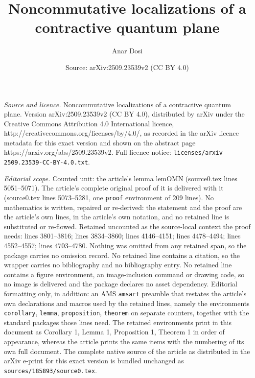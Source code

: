 \documentclass[10pt,a4paper]{amsart}
\title{Noncommutative localizations of a contractive quantum plane}
\author{Anar Dosi}
\date{Source: arXiv:2509.23539v2 (CC BY 4.0)}
\begin{document}
\maketitle

\noindent\emph{Source and licence.} Noncommutative localizations of a contractive quantum plane. Version arXiv:2509.23539v2 (CC BY 4.0), distributed by arXiv under the Creative Commons Attribution 4.0 International licence, http://creativecommons.org/licenses/by/4.0/, as recorded in the arXiv licence metadata for this exact version and shown on the abstract page https://arxiv.org/abs/2509.23539v2. Full licence notice: \texttt{licenses/arxiv-2509.23539-CC-BY-4.0.txt}.\par\smallskip

\noindent\textit{Editorial scope.} Counted unit: the article's lemma lemOMN (source0.tex lines 5051--5071). The article's complete original proof of it is delivered with it (source0.tex lines 5073--5281, one \texttt{proof} environment of 209 lines). No mathematics is written, repaired or re-derived: the statement and the proof are the article's own lines, in the article's own notation, and no retained line is substituted or re-flowed.  Retained uncounted as the source-local context the proof needs: lines 3801--3816; lines 3834--3860; lines 4146--4151; lines 4478--4494; lines 4552--4557; lines 4703--4780.  Nothing was omitted from any retained span, so the package carries no omission record.  No retained line contains a citation, so the wrapper carries no bibliography and no bibliography entry.  No retained line contains a figure environment, an image-inclusion command or drawing code, so no image is delivered and the package declares no asset dependency.  Editorial formatting only, in addition: an AMS \texttt{amsart} preamble that restates the article's own declarations and macros used by the retained lines, namely the environments \texttt{corollary}, \texttt{lemma}, \texttt{proposition}, \texttt{theorem} on separate counters, together with the standard packages those lines need.  The retained environments print in this document as Corollary 1, Lemma 1, Proposition 1, Theorem 1 in order of appearance, whereas the article prints the same items with the numbering of its own full document.  The complete native source of the article as distributed in the arXiv e-print for this exact version is bundled unchanged as \texttt{sources/185893/source0.tex}.
\end{document}
